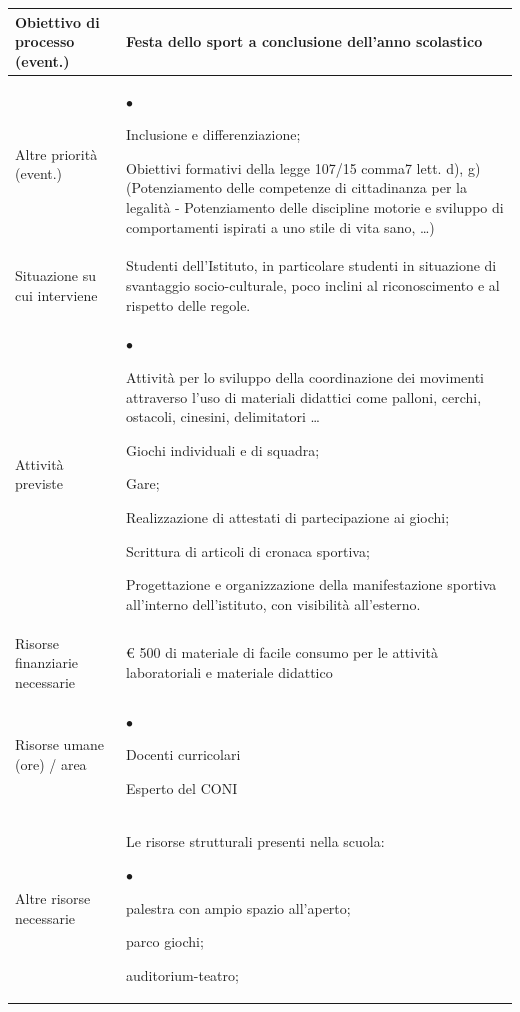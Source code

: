 \documentclass[12pt,a4paper,oneside]{memoir}
\newenvironment{elenco}{\begin{list}{$\bullet$}{%
              \setlength{\leftmargin}{4mm}%
              \setlength{\rightmargin}{1mm}%
               \setlength{\itemindent}{0mm}%
               \setlength{\labelwidth}{2mm}%
               \setlength{\labelsep}{2mm}%
              \setlength{\itemsep}{-\parsep}%
              \setlength{\partopsep}{0pt}%
              \setlength{\topsep}{0pt}%
             \setlength{\parskip}{0pt}%
              }}{\end{list}}
\begin{document}
\begin{footnotesize}
\begin{longtable}{|>{\raggedright}p{2.5cm}|>{\raggedright\arraybackslash}P{10cm}|}
Obiettivo di processo (event.)&Festa  dello sport a conclusione dell'anno scolastico\\ \hline
Altre priorità (event.)&\begin{elenco}
\item Inclusione e differenziazione;
\item Obiettivi formativi della legge 107/15 comma7 lett. d), g)  (Potenziamento delle competenze di cittadinanza  per la legalità - Potenziamento delle discipline motorie e sviluppo di comportamenti ispirati a uno stile di vita sano, \ldots)
\end{elenco}\\[-4mm] \hline
Situazione su cui interviene&Studenti dell'Istituto, in particolare studenti in situazione di svantaggio socio-culturale, poco inclini al riconoscimento e al rispetto delle regole.\\ \hline
Attività previste&\begin{elenco}
\item Attività per lo sviluppo della coordinazione dei movimenti attraverso l'uso di materiali didattici come palloni, cerchi, ostacoli, cinesini, delimitatori \ldots
\item Giochi individuali e di squadra;
\item Gare;
\item Realizzazione di attestati di partecipazione ai giochi;
\item Scrittura di articoli di cronaca sportiva;
\item Progettazione e organizzazione della manifestazione sportiva all'interno dell'istituto, con visibilità all'esterno.
\end{elenco}\\[-4mm] \hline
Risorse finanziarie necessarie&€ 500 di materiale di facile consumo per le attività laboratoriali e materiale didattico\\ \hline
Risorse umane (ore) / area&
\begin{elenco}
\item Docenti curricolari
\item Esperto del CONI\end{elenco}\\[-4mm] \hline
Altre risorse necessarie&Le risorse strutturali presenti nella scuola:
\begin{elenco}
\item palestra con ampio spazio all'aperto;
\item parco giochi;
\item auditorium-teatro;

\end{elenco}
\end{longtable}
\end{footnotesize}
\end{document}
